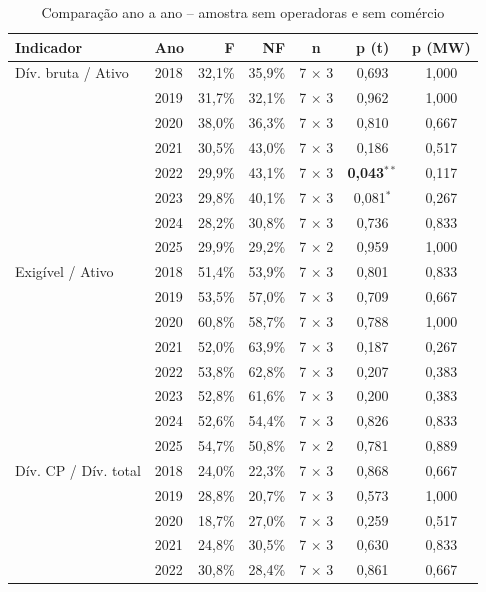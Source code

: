 \begin{table}[htb]
\caption{Comparação ano a ano -- amostra sem operadoras e sem comércio}\label{tab:banca-anual-homogenea}
\centering\footnotesize\setlength{\tabcolsep}{4pt}
\begin{tabular}{llrrccc}
\toprule
Indicador & Ano & F & NF & n & p (t) & p (MW) \\
\midrule
Dív. bruta / Ativo & 2018 & 32,1\% & 35,9\% & 7 $\times$ 3 & 0,693 & 1,000 \\
 & 2019 & 31,7\% & 32,1\% & 7 $\times$ 3 & 0,962 & 1,000 \\
 & 2020 & 38,0\% & 36,3\% & 7 $\times$ 3 & 0,810 & 0,667 \\
 & 2021 & 30,5\% & 43,0\% & 7 $\times$ 3 & 0,186 & 0,517 \\
 & 2022 & 29,9\% & 43,1\% & 7 $\times$ 3 & \textbf{0,043}$^{**}$ & 0,117 \\
 & 2023 & 29,8\% & 40,1\% & 7 $\times$ 3 & 0,081$^{*}$ & 0,267 \\
 & 2024 & 28,2\% & 30,8\% & 7 $\times$ 3 & 0,736 & 0,833 \\
 & 2025 & 29,9\% & 29,2\% & 7 $\times$ 2 & 0,959 & 1,000 \\
Exigível / Ativo & 2018 & 51,4\% & 53,9\% & 7 $\times$ 3 & 0,801 & 0,833 \\
 & 2019 & 53,5\% & 57,0\% & 7 $\times$ 3 & 0,709 & 0,667 \\
 & 2020 & 60,8\% & 58,7\% & 7 $\times$ 3 & 0,788 & 1,000 \\
 & 2021 & 52,0\% & 63,9\% & 7 $\times$ 3 & 0,187 & 0,267 \\
 & 2022 & 53,8\% & 62,8\% & 7 $\times$ 3 & 0,207 & 0,383 \\
 & 2023 & 52,8\% & 61,6\% & 7 $\times$ 3 & 0,200 & 0,383 \\
 & 2024 & 52,6\% & 54,4\% & 7 $\times$ 3 & 0,826 & 0,833 \\
 & 2025 & 54,7\% & 50,8\% & 7 $\times$ 2 & 0,781 & 0,889 \\
Dív. CP / Dív. total & 2018 & 24,0\% & 22,3\% & 7 $\times$ 3 & 0,868 & 0,667 \\
 & 2019 & 28,8\% & 20,7\% & 7 $\times$ 3 & 0,573 & 1,000 \\
 & 2020 & 18,7\% & 27,0\% & 7 $\times$ 3 & 0,259 & 0,517 \\
 & 2021 & 24,8\% & 30,5\% & 7 $\times$ 3 & 0,630 & 0,833 \\
 & 2022 & 30,8\% & 28,4\% & 7 $\times$ 3 & 0,861 & 0,667 \\

\end{tabular}
\end{table}
